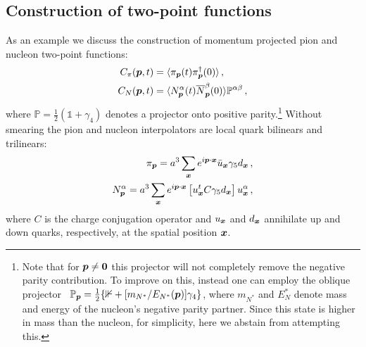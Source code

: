 \subsection{Construction of two-point functions} 
As an example we discuss the construction of momentum projected
pion and nucleon two-point functions:
\begin{align}
C_{\pi}(\boldsymbol{p},t)
&=\langle \pi_{\boldsymbol{p}} (t) \pi^{\dagger}_{\boldsymbol{p}} (0)\rangle\,,\nonumber\\
C_{N}(\boldsymbol{p},t)&=
\langle N_{\boldsymbol{p}}^{\alpha} (t) \overline{N}_{\boldsymbol{p}}^{\beta}(0)\rangle \mathbb{P}^{\alpha\beta}\,,
 \label{interpol}
\end{align}
where $\mathbb{P}=\frac{1}{2}(\mathds{1}+\gamma_4)$ denotes a projector onto
positive parity.\footnote{Note that for $\boldsymbol{p}\neq\boldsymbol{0}$
this projector will not completely remove the negative parity contribution.
To improve on this, instead one can employ the oblique
projector~\cite{Lee:1998cx}
$\mathbb{P}_{\boldsymbol{p}}=\frac{1}{2}\{\mathbb{1}+[m_{N^*}/E_{N^*}(\boldsymbol{p})]\gamma_4\}$,
where $m_{N^*}$ and $E_N^*$ denote mass and energy of the
nucleon's negative parity partner. Since this state is higher
in mass than the nucleon, for simplicity, here we abstain from attempting this.}
Without smearing the pion and nucleon interpolators
are local quark bilinears and trilinears:
\begin{align}
\pi_{\boldsymbol{p}}= a^3\sum_{\boldsymbol{x}}e^{i\boldsymbol{p}\cdot\boldsymbol{x}} \bar{u}_{\boldsymbol{x}}\gamma_5 d_{\boldsymbol{x}}\,,\\
N^{\alpha}_{\boldsymbol{p}} = a^3\sum_{\boldsymbol{x}} e^{i\boldsymbol{p}\cdot\boldsymbol{x}} \left[ u^t_{\boldsymbol{x}} C \gamma_5 d_{\boldsymbol{x}} \right]u^{\alpha}_{\boldsymbol{x}}\,,
\end{align}
where $C$ is the charge conjugation operator and $u_{\boldsymbol{x}}$ and
$d_{\boldsymbol{x}}$ annihilate up and down quarks, respectively, at the
spatial position $\boldsymbol{x}$.

